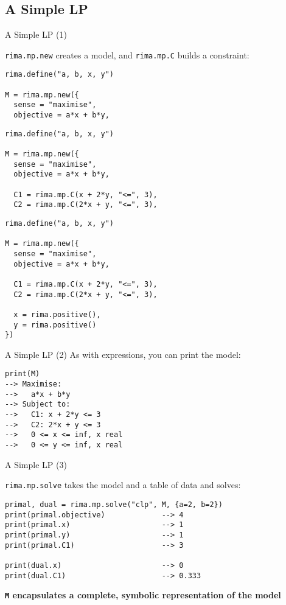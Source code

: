 \documentclass[smaller]{beamer}
\begin{document}
\subsection{A Simple LP}
\begin{frame}[fragile]{A Simple LP (1)}

  \lstinline!rima.mp.new! creates a model, and \lstinline!rima.mp.C! builds a constraint:
  \vspace{-2ex}
  \begin{overprint}
  \begin{lstlisting}
rima.define("a, b, x, y")

M = rima.mp.new({
  sense = "maximise",
  objective = a*x + b*y,
  \end{lstlisting}

  \begin{lstlisting}
rima.define("a, b, x, y")

M = rima.mp.new({
  sense = "maximise",
  objective = a*x + b*y,

  C1 = rima.mp.C(x + 2*y, "<=", 3),
  C2 = rima.mp.C(2*x + y, "<=", 3),
  \end{lstlisting}

  \begin{lstlisting}
rima.define("a, b, x, y")

M = rima.mp.new({
  sense = "maximise",
  objective = a*x + b*y,

  C1 = rima.mp.C(x + 2*y, "<=", 3),
  C2 = rima.mp.C(2*x + y, "<=", 3),

  x = rima.positive(),
  y = rima.positive()
})
  \end{lstlisting}

  \end{overprint}
\end{frame}


\begin{frame}[fragile]{A Simple LP (2)}
  As with expressions, you can print the model:
  \begin{lstlisting}
print(M)
--> Maximise:
-->   a*x + b*y
--> Subject to:
-->   C1: x + 2*y <= 3
-->   C2: 2*x + y <= 3
-->   0 <= x <= inf, x real
-->   0 <= y <= inf, x real
  \end{lstlisting}
\end{frame}


\begin{frame}[fragile]{A Simple LP (3)}

  \lstinline{rima.mp.solve} takes the model and a table of data and solves:
  \begin{lstlisting}
primal, dual = rima.mp.solve("clp", M, {a=2, b=2})
print(primal.objective)             --> 4
print(primal.x)                     --> 1
print(primal.y)                     --> 1
print(primal.C1)                    --> 3

print(dual.x)                       --> 0
print(dual.C1)                      --> 0.333
  \end{lstlisting}
  \bf{\lstinline{M} encapsulates a complete, symbolic representation of the model}
\end{frame}
\end{document}
